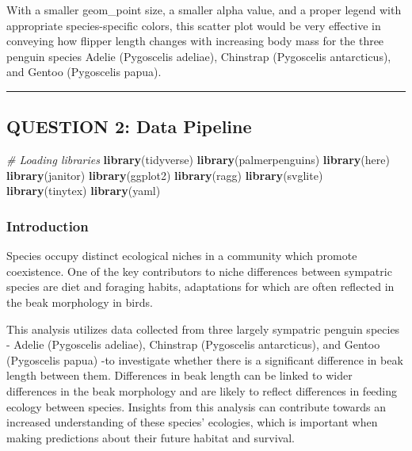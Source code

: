 \documentclass[
]{article}
\newenvironment{Shaded}{\begin{snugshade}}{\end{snugshade}}
\newcommand{\CommentTok}[1]{\textcolor[rgb]{0.56,0.35,0.01}{\textit{#1}}}
\newcommand{\FunctionTok}[1]{\textcolor[rgb]{0.13,0.29,0.53}{\textbf{#1}}}
\newcommand{\NormalTok}[1]{#1}
\begin{document}
With a smaller geom\_point size, a smaller alpha value, and a proper
legend with appropriate species-specific colors, this scatter plot would
be very effective in conveying how flipper length changes with
increasing body mass for the three penguin species Adelie (Pygoscelis
adeliae), Chinstrap (Pygoscelis antarcticus), and Gentoo (Pygoscelis
papua).

\begin{center}\rule{0.5\linewidth}{0.5pt}\end{center}

\subsection{QUESTION 2: Data Pipeline}\label{question-2-data-pipeline}

\begin{Shaded}
\begin{Highlighting}[]
\CommentTok{\# Loading libraries}
\FunctionTok{library}\NormalTok{(tidyverse)}
\FunctionTok{library}\NormalTok{(palmerpenguins)}
\FunctionTok{library}\NormalTok{(here)}
\FunctionTok{library}\NormalTok{(janitor)}
\FunctionTok{library}\NormalTok{(ggplot2)}
\FunctionTok{library}\NormalTok{(ragg)}
\FunctionTok{library}\NormalTok{(svglite)}
\FunctionTok{library}\NormalTok{(tinytex)}
\FunctionTok{library}\NormalTok{(yaml)}
\end{Highlighting}
\end{Shaded}

\subsubsection{Introduction}\label{introduction}

Species occupy distinct ecological niches in a community which promote
coexistence. One of the key contributors to niche differences between
sympatric species are diet and foraging habits, adaptations for which
are often reflected in the beak morphology in birds.

This analysis utilizes data collected from three largely sympatric
penguin species - Adelie (Pygoscelis adeliae), Chinstrap (Pygoscelis
antarcticus), and Gentoo (Pygoscelis papua) -to investigate whether
there is a significant difference in beak length between them.
Differences in beak length can be linked to wider differences in the
beak morphology and are likely to reflect differences in feeding ecology
between species. Insights from this analysis can contribute towards an
increased understanding of these species' ecologies, which is important
when making predictions about their future habitat and survival.
\end{document}
